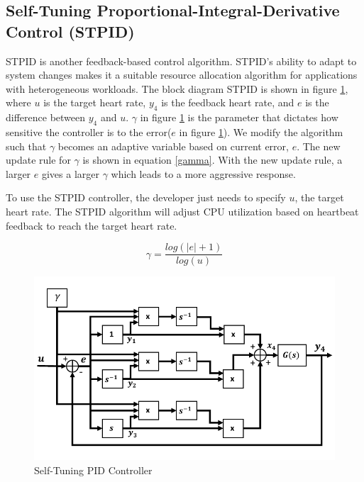 
\subsection{Self-Tuning Proportional-Integral-Derivative Control (STPID)}
STPID\cite{apid} is another feedback-based control algorithm. STPID's ability to adapt to system changes makes it a suitable resource allocation algorithm for applications with heterogeneous workloads. The block diagram STPID is shown in figure \ref{apid}, where $u$ is the target heart rate, $y_4$ is the feedback heart rate, and $e$ is the difference between $y_4$ and $u$. $\gamma$ in figure \ref{apid} is the parameter that dictates how sensitive the controller is to the error($e$ in figure \ref{apid}). We modify the algorithm such that $\gamma$ becomes an adaptive variable based on current error, $e$. The new update rule for $\gamma$ is shown in equation \ref{gamma}. With the new update rule, a larger $e$ gives a larger $\gamma$ which leads to a more aggressive response. 

To use the STPID controller, the developer just needs to specify $u$, the target heart rate. The STPID algorithm will adjust CPU utilization based on heartbeat feedback to reach the target heart rate.

\begin{equation}
\label{gamma}
\gamma =  \frac{log( \left | e \right |+1)}{log(u)}
\end{equation}

\begin{figure}[h!]
\centering
\includegraphics[width=1\linewidth]{images/apid}
\caption{Self-Tuning PID Controller\cite{apid}}
\label{apid}
\end{figure}

